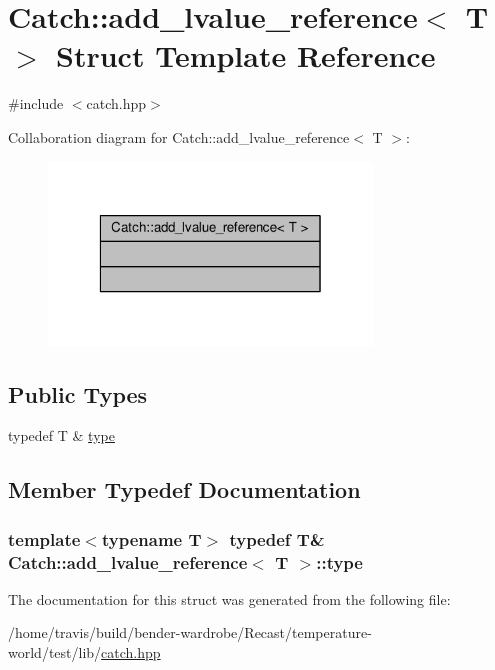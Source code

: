 \hypertarget{struct_catch_1_1add__lvalue__reference}{\section{Catch\-:\-:add\-\_\-lvalue\-\_\-reference$<$ T $>$ Struct Template Reference}
\label{struct_catch_1_1add__lvalue__reference}
}


{\ttfamily \#include $<$catch.\-hpp$>$}



Collaboration diagram for Catch\-:\-:add\-\_\-lvalue\-\_\-reference$<$ T $>$\-:
\nopagebreak
\begin{figure}[H]
\begin{center}
\leavevmode
\includegraphics[width=244pt]{struct_catch_1_1add__lvalue__reference__coll__graph}
\end{center}
\end{figure}
\subsection*{Public Types}
\begin{DoxyCompactItemize}
\item 
typedef T \& \hyperlink{struct_catch_1_1add__lvalue__reference_aeecfbd85be922b674cf8ddba5bb3eb07}{type}
\end{DoxyCompactItemize}


\subsection{Member Typedef Documentation}
\hypertarget{struct_catch_1_1add__lvalue__reference_aeecfbd85be922b674cf8ddba5bb3eb07}{
\subsubsection[{type}]{\setlength{\rightskip}{0pt plus 5cm}template$<$typename T$>$ typedef T\& {\bf Catch\-::add\-\_\-lvalue\-\_\-reference}$<$ T $>$\-::{\bf type}}}\label{struct_catch_1_1add__lvalue__reference_aeecfbd85be922b674cf8ddba5bb3eb07}


The documentation for this struct was generated from the following file\-:\begin{DoxyCompactItemize}
\item 
/home/travis/build/bender-\/wardrobe/\-Recast/temperature-\/world/test/lib/\hyperlink{catch_8hpp}{catch.\-hpp}\end{DoxyCompactItemize}

